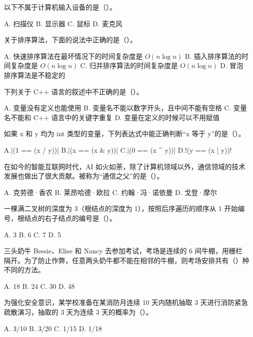 \documentclass{cspexam}
\begin{document}
\Q 以下不属于计算机输入设备的是（\quad）。
\begin{optrow}
\op A. 扫描仪 \op B. 显示器 \op C. 鼠标 \op D. 麦克风
\end{optrow}

\Q 关于排序算法，下面的说法中正确的是（\quad）。
\begin{optcol}
\op A. 快速排序算法在最坏情况下的时间复杂度是 \(O(n\log n)\)
\op B. 插入排序算法的时间复杂度是 \(O(n\log n)\)
\op C. 归并排序算法的时间复杂度是 \(O(n\log n)\)
\op D. 冒泡排序算法是不稳定的
\end{optcol}

\Q 下列关于 C++ 语言的叙述中不正确的是（\quad）。
\begin{optcol}
\op A. 变量没有定义也能使用
\op B. 变量名不能以数字开头，且中间不能有空格
\op C. 变量名不能和 C++ 语言中的关键字重复
\op D. 变量在定义的时候可以不用赋值
\end{optcol}

\Q 如果 x 和 y 均为 int 类型的变量，下列表达式中能正确判断“x 等于 y”的是（\quad）。
\begin{optgrid}
\op A.\co|(1 == (x / y))|
\op B.\co|(x == (x & y))|
\op C.\co|(0 == (x ^ y))|
\op D.\co!(y == (x | y))!
\end{optgrid}

\Q 在如今的智能互联网时代，AI 如火如荼，除了计算机领域以外，通信领域的技术发展也做出了很大贡献。被称为“通信之父”的是（\quad）。
\begin{optgrid}
\op A. 克劳德·香农
\op B. 莱昂哈德·欧拉
\op C. 约翰·冯·诺依曼
\op D. 戈登·摩尔
\end{optgrid}

\Q 一棵满二叉树的深度为 3（根结点的深度为 1），按照后序遍历的顺序从 1 开始编号，根结点的右子结点的编号是（\quad）。
\begin{optrow}
\op A. 3 \op B. 6 \op C. 7 \op D. 5
\end{optrow}

\Q 三头奶牛 Bessie、Elise 和 Nancy 去参加考试，考场是连续的 6 间牛棚，用栅栏隔开。为了防止作弊，任意两头奶牛都不能在相邻的牛棚，则考场安排共有（\quad）种不同的方法。
\begin{optrow}
\op A. 18 \op B. 24 \op C. 30 \op D. 48
\end{optrow}

\Q 为强化安全意识，某学校准备在某消防月连续 10 天内随机抽取 3 天进行消防紧急疏散演习，抽取的 3 天为连续 3 天的概率为（\quad）。
\begin{optrow}
\op A. 3/10 \op B. 3/20 \op C. 1/15 \op D. 1/18
\end{optrow}
\end{document}
